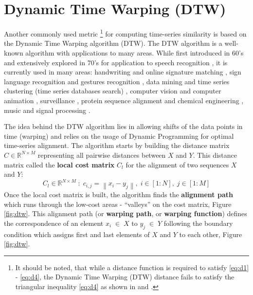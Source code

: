 \section{Dynamic Time Warping (DTW)}\label{dtw}
Another commonly used metric 
\footnote{It should be noted, that while a distance function is required to satisfy \ref{eq:d1} - \ref{eq:d4}, the Dynamic Time Warping (DTW) distance fails to satisfy the triangular inequality \ref{eq:d4} as shown in \cite{citeulike:4343286} and \cite{citeulike:4343933}.}
for computing time-series similarity is based on the Dynamic Time Warping algorithm (DTW). The DTW algorithm is a well-known algorithm with applications to many areas. While first introduced in 60's \cite{citeulike:3733907} and extensively explored in 70's for application to speech recognition \cite{citeulike:603020}, \cite{citeulike:3496861} it is currently used in many areas: handwriting and online signature matching \cite{citeulike:2838910} \cite{citeulike:2584345}, sign language recognition \cite{citeulike:3789957} and gestures recognition \cite{citeulike:3789964} \cite{citeulike:3789957}, data mining and time series clustering (time series databases search) \cite{citeulike:3815076} \cite{citeulike:3733893} \cite{citeulike:3788783} \cite{citeulike:3731715} \cite{citeulike:3731713} \cite{citeulike:3789897}, computer vision and computer animation \cite{citeulike:3728229}, surveillance \cite{citeulike:964832}, protein sequence alignment and chemical engineering \cite{citeulike:3733894}, music and signal processing \cite{citeulike:3736775} \cite{citeulike:3728229} \cite{citeulike:3728228}.

The idea behind the DTW algorithm lies in allowing shifts of the data points in time (warping) and relies on the usage of Dynamic Programming \cite{citeulike:3733907} for optimal time-series alignment. The algorithm starts by building the distance matrix $C \in \mathbb{R}^{N \times M}$ representing all pairwise distances between $X$ and $Y$. This distance matrix called the \textbf{local cost matrix} $C_{l}$ for the alignment of two sequences $X$ and $Y$:
\begin{equation}
\label{eq:localcost}
C_{l} \in \mathbb{R}^{N \times M} \; : \; c_{i,j} = \left\| x_{i} - y_{j} \right\|, \; i \in [1:N], \; j \in [1:M]
\end{equation}
Once the local cost matrix is built, the algorithm finds the \textbf{alignment path} which runs through the low-cost areas - ``valleys'' on the cost matrix, Figure \ref{fig:dtw}. This alignment path (or \textbf{warping path}, or \textbf{warping function}) defines the correspondence of an element $x_{i} \; \in \; X$ to $y_{j} \; \in \; Y$ following the boundary condition which assigns first and last elements of $X$ and $Y$ to each other, Figure \ref{fig:dtw}.

